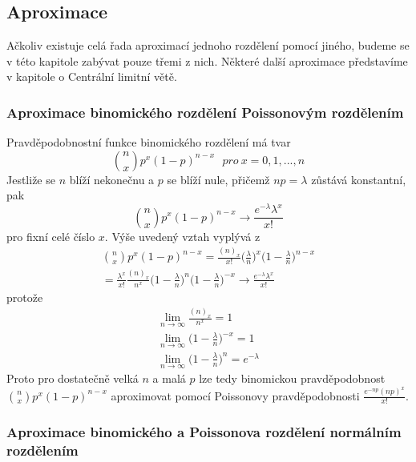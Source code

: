 \subsection{Aproximace}

Ačkoliv existuje celá řada aproximací jednoho rozdělení pomocí jiného, budeme se v této kapitole zabývat pouze třemi z nich. Některé další aproximace představíme v kapitole o Centrální limitní větě.

\subsubsection{Aproximace binomického rozdělení Poissonovým rozdělením}

Pravděpodobnostní funkce binomického rozdělení má tvar
\begin{equation*}
\binom{n}{x}p^x(1 - p)^{n-x}~~~\textit{pro}~x = 0, 1, ..., n
\end{equation*}
Jestliže se $n$ blíží nekonečnu a $p$ se blíží nule, přičemž $np = \lambda$ zůstává konstantní, pak
\begin{equation*}
\binom{n}{x}p^x(1 - p)^{n-x} \rightarrow \frac{e^{-\lambda} \lambda^x}{x!}
\end{equation*}
pro fixní celé číslo $x$. Výše uvedený vztah vyplývá z
\begin{gather*}
\binom{n}{x}p^x(1 - p)^{n - x} = \frac{(n)_x}{x!}\Big(\frac{\lambda}{n}\Big)^x \Big(1 - \frac{\lambda}{n} \Big)^{n-x}\\
= \frac{\lambda^x}{x!} \frac{(n)_x}{n^x}\Big(1 - \frac{\lambda}{n}\Big)^n\Big(1 - \frac{\lambda}{n} \Big)^{-x} \rightarrow \frac{e^{-\lambda}\lambda^x}{x!}
\end{gather*}
protože
\begin{gather*}
\lim_{n \rightarrow \infty}\frac{(n)_x}{n^x} = 1\\
\lim_{n \rightarrow \infty}\Big(1 - \frac{\lambda}{n}\Big)^{-x} = 1\\
\lim_{n \rightarrow \infty}\Big(1 - \frac{\lambda}{n} \Big)^n = e^{-\lambda}
\end{gather*}
Proto pro dostatečně velká $n$ a malá $p$ lze tedy binomickou pravděpodobnost $\binom{n}{x}p^x(1 - p)^{n-x}$ aproximovat pomocí Poissonovy pravděpodobnosti $\frac{e^{-np}(np)^x}{x!}$.

\subsubsection{Aproximace binomického a Poissonova rozdělení normálním rozdělením}

